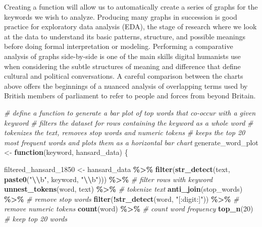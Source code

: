 \documentclass[
]{article}
\newenvironment{Shaded}{\begin{snugshade}}{\end{snugshade}}
\newcommand{\CommentTok}[1]{\textcolor[rgb]{0.56,0.35,0.01}{\textit{#1}}}
\newcommand{\ControlFlowTok}[1]{\textcolor[rgb]{0.13,0.29,0.53}{\textbf{#1}}}
\newcommand{\DecValTok}[1]{\textcolor[rgb]{0.00,0.00,0.81}{#1}}
\newcommand{\FunctionTok}[1]{\textcolor[rgb]{0.13,0.29,0.53}{\textbf{#1}}}
\newcommand{\NormalTok}[1]{#1}
\newcommand{\OtherTok}[1]{\textcolor[rgb]{0.56,0.35,0.01}{#1}}
\newcommand{\SpecialCharTok}[1]{\textcolor[rgb]{0.81,0.36,0.00}{\textbf{#1}}}
\newcommand{\StringTok}[1]{\textcolor[rgb]{0.31,0.60,0.02}{#1}}
\begin{document}
Creating a function will allow us to automatically create a series of
graphs for the keywords we wish to analyze. Producing many graphs in
succession is good practice for exploratory data analysis (EDA), the
stage of research where we look at the data to understand its basic
patterns, structure, and possible meanings before doing formal
interpretation or modeling. Performing a comparative analysis of graphs
side-by-side is one of the main skills digital humanists use when
considering the subtle structures of meaning and difference that define
cultural and political conversations. A careful comparison between the
charts above offers the beginnings of a nuanced analysis of overlapping
terms used by British members of parliament to refer to people and
forces from beyond Britain.

\begin{Shaded}
\begin{Highlighting}[]
\CommentTok{\# define a function to generate a bar plot of top words that co{-}occur with a given keyword}
\CommentTok{\# filters the dataset for rows containing the keyword as a whole word}
\CommentTok{\# tokenizes the text, removes stop words and numeric tokens}
\CommentTok{\# keeps the top 20 most frequent words and plots them as a horizontal bar chart}
\NormalTok{generate\_word\_plot }\OtherTok{\textless{}{-}} \ControlFlowTok{function}\NormalTok{(keyword, hansard\_data) \{}
    
\NormalTok{    filtered\_hansard\_1850 }\OtherTok{\textless{}{-}}\NormalTok{ hansard\_data }\SpecialCharTok{\%\textgreater{}\%}
      \FunctionTok{filter}\NormalTok{(}\FunctionTok{str\_detect}\NormalTok{(text, }\FunctionTok{paste0}\NormalTok{(}\StringTok{"}\SpecialCharTok{\textbackslash{}\textbackslash{}}\StringTok{b"}\NormalTok{, keyword, }\StringTok{"}\SpecialCharTok{\textbackslash{}\textbackslash{}}\StringTok{b"}\NormalTok{))) }\SpecialCharTok{\%\textgreater{}\%} \CommentTok{\# filter rows with keyword}
      \FunctionTok{unnest\_tokens}\NormalTok{(word, text) }\SpecialCharTok{\%\textgreater{}\%} \CommentTok{\# tokenize text}
      \FunctionTok{anti\_join}\NormalTok{(stop\_words) }\SpecialCharTok{\%\textgreater{}\%} \CommentTok{\# remove stop words}
      \FunctionTok{filter}\NormalTok{(}\SpecialCharTok{!}\FunctionTok{str\_detect}\NormalTok{(word, }\StringTok{"[:digit:]"}\NormalTok{)) }\SpecialCharTok{\%\textgreater{}\%} \CommentTok{\# remove numeric tokens}
      \FunctionTok{count}\NormalTok{(word) }\SpecialCharTok{\%\textgreater{}\%} \CommentTok{\# count word frequency}
      \FunctionTok{top\_n}\NormalTok{(}\DecValTok{20}\NormalTok{) }\CommentTok{\# keep top 20 words}
    

\end{Highlighting}
\end{Shaded}
\end{document}
